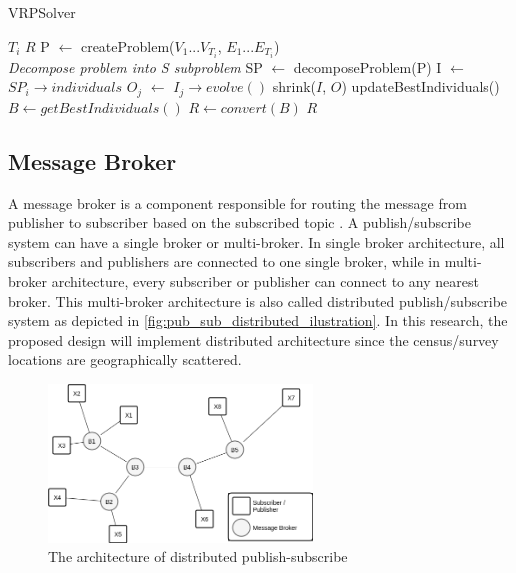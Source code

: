 \documentclass[conference]{IEEEtran}
\begin{document}
\begin{algorithm}[!]
	\caption{VRPSolver}
	\label{alg:vrp-solver}
	\begin{algorithmic}[1]
		\renewcommand{\algorithmicrequire}{\textbf{Input:}}
		\renewcommand{\algorithmicensure}{\textbf{Output:}}
		\REQUIRE $T_i$
		\ENSURE  $R$
		\STATE P $\leftarrow$ createProblem($V_1...V_{T_i}$, $E_1...E_{T_i}$)
		\\ \textit{Decompose problem into S subproblem}
		\STATE SP $\leftarrow$ decomposeProblem(P)
				\STATE I $\leftarrow$ $SP_i \rightarrow individuals$
					\STATE $O_j$ $\leftarrow$ $I_j \rightarrow evolve()$
				\ENDFOR
				\STATE shrink($I$, $O$)
			\ENDFOR
			\STATE updateBestIndividuals()
		\ENDWHILE
		\STATE $B \leftarrow getBestIndividuals()$ 
		\STATE $R \leftarrow convert(B)$ 
		\RETURN $R$
	\end{algorithmic}
\end{algorithm}


\subsection{Message Broker}
\label{ssec:message-broker}
A message broker is a component responsible for routing the message from publisher to subscriber based on the subscribed topic \cite{banavar_efficient_1999}. A publish/subscribe system can have a single broker or multi-broker. In single broker architecture, all subscribers and publishers are connected to one single broker, while in multi-broker architecture, every subscriber or publisher can connect to any nearest broker. This multi-broker architecture is also called distributed publish/subscribe system \cite{muhl_large-scale_2002} as depicted in \autoref{fig:pub_sub_distributed_ilustration}. In this research, the proposed design will implement distributed architecture since the census/survey locations are geographically scattered. 


\begin{figure}[!]
	\centering
	\includegraphics[width=7cm]{Resources/Images/pub_sub_distributed_ilustration}
	\caption{The architecture of distributed publish-subscribe}
	\label{fig:pub_sub_distributed_ilustration}
\end{figure}
\end{document}
